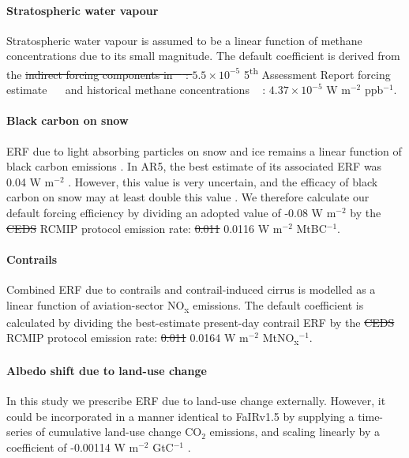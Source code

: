 \documentclass[gmd, manuscript]{copernicus}
\providecommand{\DIFadd}[1]{{\protect\color{blue}#1}} %
\providecommand{\DIFdel}[1]{{\protect\color{red}\sout{#1}}}                      %
\providecommand{\DIFaddbegin}{} %
\providecommand{\DIFaddend}{} %
\providecommand{\DIFdelbegin}{} %
\providecommand{\DIFdelend}{} %
\begin{document}
\paragraph*{Stratospheric water vapour}
Stratospheric water vapour is assumed to be a linear function of methane concentrations \citep{Smith2018} due to its small magnitude. The default coefficient is derived from the \DIFdelbegin \DIFdel{indirect forcing components in \mbox{%
\cite{Holmes2013}}\hspace{0pt}%
: $5.5\times10^{-5}$ }\DIFdelend \DIFaddbegin \DIFadd{5\textsuperscript{th} Assessment Report forcing estimate \mbox{%
\citep{Myhre2013a} }\hspace{0pt}%
and historical methane concentrations \mbox{%
\citep{Meinshausen2017}}\hspace{0pt}%
: $4.37\times10^{-5}$ }\DIFaddend W m$^{-2}$ ppb$^{-1}$.
\paragraph*{Black carbon on snow}
ERF due to light absorbing particles on snow and ice remains a linear function of black carbon emissions \citep{Smith2018}. In AR5, the best estimate of its associated ERF was 0.04 W m$^{-2}$ \citep{Myhre2013a}. However, this value is very uncertain, and the efficacy of black carbon on snow may at least double this value \citep{Bond2013}. We therefore calculate our default forcing efficiency by dividing an adopted value of -0.08 W m$^{-2}$ by the \DIFdelbegin \DIFdel{CEDS }\DIFdelend \DIFaddbegin \DIFadd{RCMIP protocol }\DIFaddend emission rate: \DIFdelbegin \DIFdel{0.011 }\DIFdelend \DIFaddbegin \DIFadd{0.0116 }\DIFaddend W m$^{-2}$ MtBC$^{-1}$.
\paragraph*{Contrails}
Combined ERF due to contrails and contrail-induced cirrus is modelled as a linear function of aviation-sector NO\textsubscript{x} emissions. The default coefficient is calculated by dividing the best-estimate present-day contrail ERF \citep{Lee2020} by the \DIFdelbegin \DIFdel{CEDS }\DIFdelend \DIFaddbegin \DIFadd{RCMIP protocol }\DIFaddend emission rate: \DIFdelbegin \DIFdel{0.011 }\DIFdelend \DIFaddbegin \DIFadd{0.0164 }\DIFaddend W m$^{-2}$ MtNO\textsubscript{x}$^{-1}$.
\paragraph*{Albedo shift due to land-use change}
In this study we prescribe ERF due to land-use change externally. However, it could be incorporated in a manner identical to FaIRv1.5 by supplying a time-series of cumulative land-use change CO$_2$ emissions, and scaling linearly by a coefficient of -0.00114 W m$^{-2}$ GtC$^{-1}$ \citep{Smith2018}.
\end{document}
